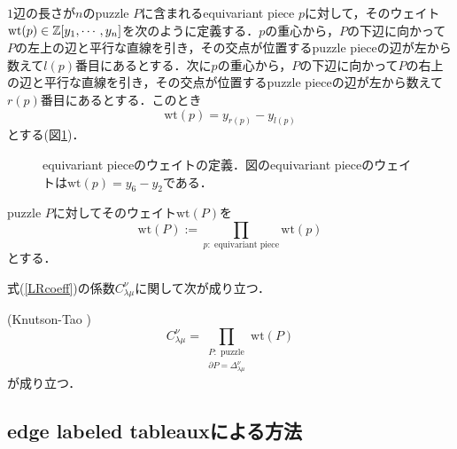 \begin{defin}\label{weight of piece}
  $1$辺の長さが$n$のpuzzle $P$に含まれるequivariant piece $p$に対して，そのウェイト$\text{wt}(p) \in\mathbb{Z}[y_1,\cdots,y_n]$を次のように定義する．$p$の重心から，$P$の下辺に向かって$P$の左上の辺と平行な直線を引き，その交点が位置するpuzzle pieceの辺が左から数えて$l(p)$番目にあるとする．次に$p$の重心から，$P$の下辺に向かって$P$の右上の辺と平行な直線を引き，その交点が位置するpuzzle pieceの辺が左から数えて$r(p)$番目にあるとする．このとき
  \[
  \text{wt}(p)=y_{r(p)}-y_{l(p)}
  \]
  とする(図\ref{puzzle weight})．
\end{defin}

\begin{figure}[htbp]
  \centering
  \caption{equivariant pieceのウェイトの定義．図のequivariant pieceのウェイトは$\text{wt}(p)=y_6-y_2$である．}\label{puzzle weight}
\end{figure}


\begin{defin}
  puzzle $P$に対してそのウェイト$\text{wt}(P)$を
  \[
  \text{wt}(P):=\prod_{p:\text{ equivariant piece}}\text{wt}(p)
  \]
  とする．
\end{defin}

式(\ref{LRcoeff})の係数$C^\nu_{\lambda\mu}$に関して次が成り立つ．

\begin{theo}(Knutson-Tao \cite{knutson tao})\label{puzzle calculation}
  \[
  C^\nu_{\lambda\mu}=\prod_{\substack{P:\text{ puzzle} \\ \partial P = \Delta^\nu_{\lambda\mu}}}\text{wt}(P)
  \]
  が成り立つ．
\end{theo}



\subsection{edge labeled tableauxによる方法}

